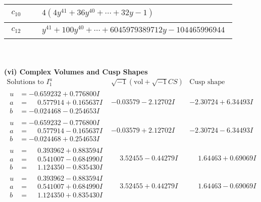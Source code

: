 \documentclass[1p]{elsarticle_modified}
\theoremstyle{definition}
\newcommand{\I}{\sqrt{-1}}
\begin{document}
\begin{tabular}{m{50pt}|m{274pt}}
\hline $$\begin{aligned}c_{10}\end{aligned}$$&$\begin{aligned}
&4(4 y^{41}+36 y^{40}+\cdots+32 y-1)
\end{aligned}$\\
\hline $$\begin{aligned}c_{12}\end{aligned}$$&$\begin{aligned}
&y^{41}+100 y^{40}+\cdots+6045979389712 y-104465996944
\end{aligned}$\\
\hline
\end{tabular}\\~\\
\newpage\flushleft \textbf{(vi) Complex Volumes and Cusp Shapes}
$$\begin{array}{c|c|c}  
\text{Solutions to }I^u_{1}& \I (\text{vol} + \sqrt{-1}CS) & \text{Cusp shape}\\
 \hline 
\begin{aligned}
u &= -0.659232 + 0.776800 I \\
a &= \phantom{-}0.577914 + 0.165637 I \\
b &= -0.024468 - 0.254653 I\end{aligned}
 & -0.03579 - 2.12702 I & -2.30724 + 6.34493 I \\ \hline\begin{aligned}
u &= -0.659232 - 0.776800 I \\
a &= \phantom{-}0.577914 - 0.165637 I \\
b &= -0.024468 + 0.254653 I\end{aligned}
 & -0.03579 + 2.12702 I & -2.30724 - 6.34493 I \\ \hline\begin{aligned}
u &= \phantom{-}0.393962 + 0.883594 I \\
a &= \phantom{-}0.541007 - 0.684990 I \\
b &= \phantom{-}1.124350 - 0.835430 I\end{aligned}
 & \phantom{-}3.52455 - 0.44279 I & \phantom{-}1.64463 + 0.69069 I \\ \hline\begin{aligned}
u &= \phantom{-}0.393962 - 0.883594 I \\
a &= \phantom{-}0.541007 + 0.684990 I \\
b &= \phantom{-}1.124350 + 0.835430 I\end{aligned}
 & \phantom{-}3.52455 + 0.44279 I & \phantom{-}1.64463 - 0.69069 I \\ \hline\begin{aligned}

\end{aligned}
\end{array}$$
\end{document}
